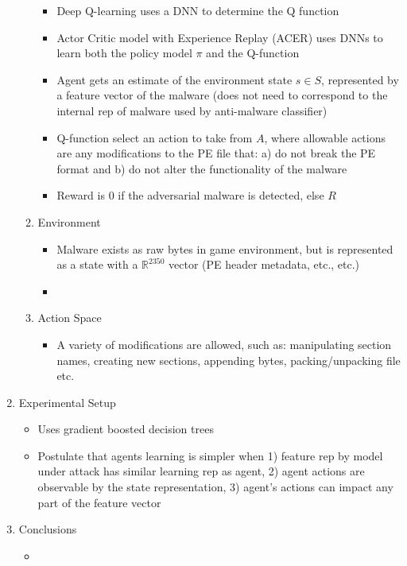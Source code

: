 \documentclass{article}
\begin{document}
\begin{enumerate}
\begin{enumerate}
\begin{itemize}
			\item Deep Q-learning uses a DNN to determine the Q function
			\item Actor Critic model with Experience Replay (ACER) uses DNNs to learn both the policy model $\pi$ and the Q-function
			\item Agent gets an estimate of the environment state $s \in S$, represented by a feature vector of the malware (does not need to correspond to the internal rep of malware used by anti-malware classifier)
			\item Q-function select an action to take from $A$, where allowable actions are any modifications to the PE file that: a) do not break the PE format and b) do not alter the functionality of the malware
			\item Reward is 0 if the adversarial malware is detected, else $R$
		\end{itemize}
		\item Environment
		\begin{itemize}
			\item Malware exists as raw bytes in game environment, but is represented as a state with a $\mathbb{R}^{2350}$ vector (PE header metadata, etc., etc.)
			\item 
		\end{itemize}
		\item Action Space
		\begin{itemize}
			\item A variety of modifications are allowed, such as: manipulating section names, creating new sections, appending bytes, packing/unpacking file etc.
		\end{itemize}
	\end{enumerate}
	\item Experimental Setup
	\begin{itemize}
		\item Uses gradient boosted decision trees
		\item Postulate that agents learning is simpler when 1) feature rep by model under attack has similar learning rep as agent, 2) agent actions are observable by the state representation, 3) agent's actions can impact any part of the feature vector
	\end{itemize}
	\item Conclusions
	\begin{itemize}
		\item 
	\end{itemize}
\end{enumerate}
\pagebreak
\end{document}
